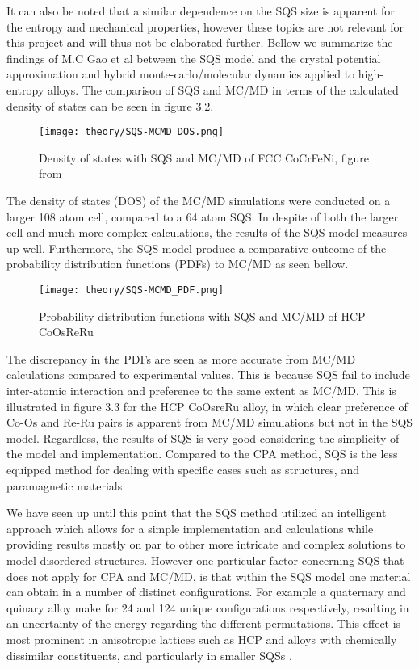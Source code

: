 It can also be noted that a similar dependence on the SQS size is apparent for the entropy and mechanical properties, however these topics are not relevant for this project and will thus not be elaborated further. Bellow we summarize the findings of M.C Gao et al between the SQS model and the crystal potential approximation and hybrid monte-carlo/molecular dynamics applied to high-entropy alloys. The comparison of SQS and MC/MD in terms of the calculated density of states can be seen in figure 3.2.
      
\begin{figure}[H]
\centering
\texttt{[image: theory/SQS-MCMD\_DOS.png]}
\caption{Density of states with SQS and MC/MD of FCC CoCrFeNi, figure from \cite{hea2016_ch10}}
\end{figure}

The density of states (DOS) of the MC/MD simulations were conducted on a larger 108 atom cell, compared to a 64 atom SQS. In despite of both the larger cell and much more complex calculations, the results of the SQS model measures up well. Furthermore, the SQS model produce a comparative outcome of the probability distribution functions (PDFs) to MC/MD as seen bellow. 

\begin{figure}[H]
\centering
\texttt{[image: theory/SQS-MCMD\_PDF.png]}
\caption{Probability distribution functions with SQS and MC/MD of HCP CoOsReRu \cite{hea2016_ch10}}
\end{figure}

The discrepancy in the PDFs are seen as more accurate from MC/MD calculations compared to experimental values. This is because SQS fail to include inter-atomic interaction and preference to the same extent as MC/MD. This is illustrated in figure 3.3 for the HCP CoOsreRu alloy, in which clear preference of Co-Os and Re-Ru pairs is apparent from MC/MD simulations but not in the SQS model. Regardless, the results of SQS is very good considering the simplicity of the model and implementation. Compared to the CPA method, SQS is the less equipped method for dealing with specific cases such as  structures, and paramagnetic materials \cite{hea2016_ch10} 

We have seen up until this point that the SQS method utilized an intelligent approach which allows for a simple implementation and calculations while providing results mostly on par to other more intricate and complex solutions to model disordered structures. However one particular factor concerning SQS that does not apply for CPA and MC/MD, is that within the SQS model one material can obtain in a number of distinct configurations. For example a quaternary and quinary alloy make for 24 and 124 unique configurations respectively, resulting in an uncertainty of the energy regarding the different permutations. This effect is most prominent in anisotropic lattices such as HCP and alloys with chemically dissimilar constituents, and particularly in smaller SQSs \cite{hea2016_ch10}. 

